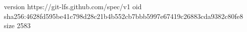 version https://git-lfs.github.com/spec/v1
oid sha256:4628fd595be41c798d28c21b4b552cb7bbb5997e67419c26883cda9382c80fe8
size 2583
